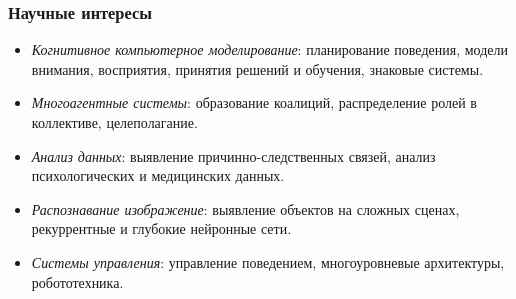 \documentclass[default]{beamer}
\begin{document}
	\begin{frame}
		\frametitle{Научные интересы}
		
		\begin{itemize}
			\item \textit{Когнитивное компьютерное моделирование}: планирование поведения, модели внимания, восприятия, принятия решений и обучения, знаковые системы.
			\item \textit{Многоагентные системы}: образование коалиций, распределение ролей в коллективе, целеполагание.
			\item \textit{Анализ данных}: выявление причинно-следственных связей, анализ психологических и медицинских данных.
			\item \textit{Распознавание изображение}: выявление объектов на сложных сценах, рекуррентные и глубокие нейронные сети.
			\item \textit{Системы управления}: управление поведением, многоуровневые архитектуры, робототехника.
		\end{itemize}
	\end{frame}
	
\end{document}
